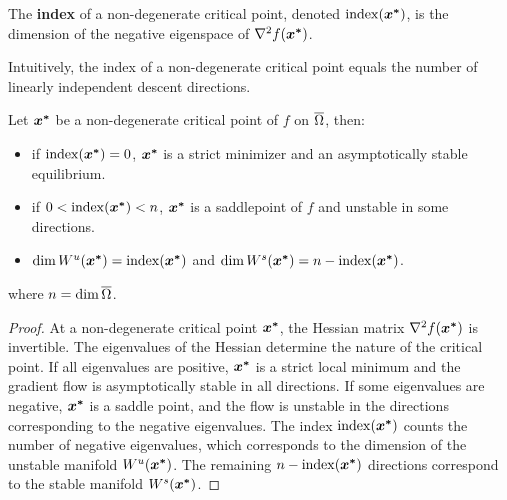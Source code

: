 \documentclass[10pt]{article}
\begin{document}
        \medskip
        
        \begin{definition}
            The \textbf{index} of a non-degenerate critical point, denoted $\operatorname{index}(\bm{x^*})$, is the dimension of the negative 
            eigenspace of $\nabla^2 f(\bm{x^*})$.
        \end{definition}
        
        \medskip
        
        Intuitively, the index of a non-degenerate critical point equals the number of linearly independent descent directions.
  
        \medskip 

        \begin{theorem}
            Let $\bm{x^*}$ be a non-degenerate critical point of $f$ on $\overline{\Omega}$, then:
            \begin{itemize}
                \item if $\operatorname{index}(\bm{x^*}) = 0$, $\bm{x^*}$ is a strict minimizer and an asymptotically 
                stable equilibrium.
                \item if $0 < \operatorname{index}(\bm{x^*}) < n$, $\bm{x^*}$ is a saddlepoint of $f$ and unstable in
                some directions.
                \item $\dim W^u(\bm{x^*}) = \operatorname{index}(\bm{x^*})$ and $\dim W^s(\bm{x^*}) = n - \operatorname{index}(\bm{x^*})$.
            \end{itemize}
            where $n = \dim \overline{\Omega}$.
        \end{theorem}

        \begin{proof}
            At a non-degenerate critical point $\bm{x^*}$, the Hessian matrix $\nabla^2 f(\bm{x^*})$ 
            is invertible. The eigenvalues of the Hessian determine the nature of the critical point.
            If all eigenvalues are positive, $\bm{x^*}$ is a strict local minimum and the
            gradient flow is asymptotically stable in all directions.
            If some eigenvalues are negative, $\bm{x^*}$ is a saddle point, and the flow 
            is unstable in the directions corresponding to the negative eigenvalues.
            The index $\operatorname{index}(\bm{x^*})$ counts the number of negative eigenvalues, 
            which corresponds to the dimension of the unstable manifold $W^u(\bm{x^*})$.
            The remaining $n - \operatorname{index}(\bm{x^*})$ directions correspond to the stable 
            manifold $W^s(\bm{x^*})$.
        \end{proof}
\end{document}
